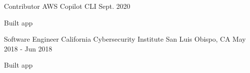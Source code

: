 

\begin{cventries}
  \cventry
    {Contributor} %
    {AWS Copilot CLI} %
    {} %
    {Sept. 2020} %
    {
      \begin{cvitems} %
        \item {Built app}
      \end{cvitems}
    }


  \cventry
    {Software Engineer} %
    {California Cybersecurity Institute} %
    {San Luis Obispo, CA} %
    {May 2018 - Jun 2018} %
    {
      \begin{cvitems} %
        \item {Built app}
      \end{cvitems}
    }

\end{cventries}
